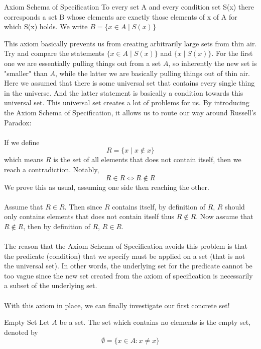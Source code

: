 \documentclass[a4paper]{article}
\begin{document}
\begin{axm}{Axiom Schema of Specification}{} To every set A and every condition set S(x) there corresponds a set B whose elements are exactly those elements of x of A for which S(x) holds. We write $B=\{x\in A\;|\;S(x)\}$
\end{axm}

This axiom basically prevents us from creating arbitrarily large sets from thin air. Try and compare the statements $\{x\in A\;|\;S(x)\}$ and $\{x\;|\;S(x)\}$. For the first one we are essentially pulling things out from a set $A$, so inherently the new set is "smaller" than $A$, while the latter we are basically pulling things out of thin air. Here we assumed that there is some universal set that contains every single thing in the universe. And the latter statement is basically a condition towards this universal set. This universal set creates a lot of problems for us. By introducing the Axiom Schema of Specification, it allows us to route our way around Russell's Paradox:\\~\\

If we define $$R=\{x\;|\;x\notin x\}$$ which means $R$ is the set of all elements that does not contain itself, then we reach a contradiction. Notably, $$R\in R\iff R\notin R$$ We prove this as usual, assuming one side then reaching the other. \\~\\
Assume that $R\in R$. Then since $R$ contains itself, by definition of $R$, $R$ should only contains elements that does not contain itself thus $R\notin R$. Now assume that $R\notin R$, then by definition of $R$, $R\in R$. \\~\\
The reason that the Axiom Schema of Specification avoids this problem is that the predicate (condition) that we specify must be applied on a set (that is not the universal set). In other words, the underlying set for the predicate cannot be too vague since the new set created from the axiom of specification is necessarily a subset of the underlying set. \\~\\
With this axiom in place, we can finally investigate our first concrete set!

\begin{defn}{Empty Set}{} Let $A$ be a set. The set which contains no elements is the empty set, denoted by $$\emptyset=\{x\in A:x\neq x\}$$
\end{defn}
\end{document}
